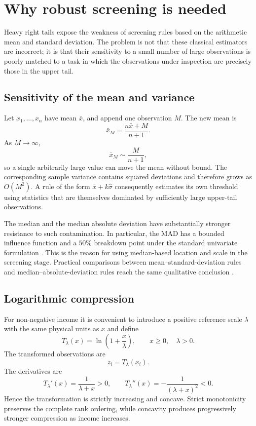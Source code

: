 \documentclass[12pt]{article}
\newcommand{\be}{\begin{equation}}
\newcommand{\ee}{\end{equation}}
\numberwithin{equation}{section}
\begin{document}
\section{Why robust screening is needed}

Heavy right tails expose the weakness of screening rules based on the arithmetic mean and standard deviation. The problem is not that these classical estimators are incorrect; it is that their sensitivity to a small number of large observations is poorly matched to a task in which the observations under inspection are precisely those in the upper tail.

\subsection{Sensitivity of the mean and variance}

Let $x_1,\ldots,x_n$ have mean $\bar{x}$, and append one observation $M$. The new mean is
\be
\bar{x}_{M}
=
\frac{n\bar{x}+M}{n+1}.
\label{eq:contaminated-mean}
\ee
As $M\rightarrow\infty$,
\be
\bar{x}_{M}
\sim
\frac{M}{n+1},
\label{eq:mean-divergence}
\ee
so a single arbitrarily large value can move the mean without bound. The corresponding sample variance contains squared deviations and therefore grows as $O(M^2)$. A rule of the form $\bar{x}+k\hat{\sigma}$ consequently estimates its own threshold using statistics that are themselves dominated by sufficiently large upper-tail observations.

The median and the median absolute deviation have substantially stronger resistance to such contamination. In particular, the MAD has a bounded influence function and a $50\%$ breakdown point under the standard univariate formulation \cite{rousseeuw1993}. This is the reason for using median-based location and scale in the screening stage. Practical comparisons between mean--standard-deviation rules and median--absolute-deviation rules reach the same qualitative conclusion \cite{leys2013}.

\subsection{Logarithmic compression}

For non-negative income it is convenient to introduce a positive reference scale $\lambda$ with the same physical units as $x$ and define
\be
T_{\lambda}(x)
=
\ln\left(1+\frac{x}{\lambda}\right),
\qquad x\geq 0,
\quad \lambda>0.
\label{eq:log-map}
\ee
The transformed observations are
\be
z_i=T_{\lambda}(x_i).
\label{eq:z-transform}
\ee
The derivatives are
\be
T_{\lambda}'(x)
=
\frac{1}{\lambda+x}>0,
\qquad
T_{\lambda}''(x)
=
-\frac{1}{(\lambda+x)^2}<0.
\label{eq:log-derivatives}
\ee
Hence the transformation is strictly increasing and concave. Strict monotonicity preserves the complete rank ordering, while concavity produces progressively stronger compression as income increases.
\end{document}
